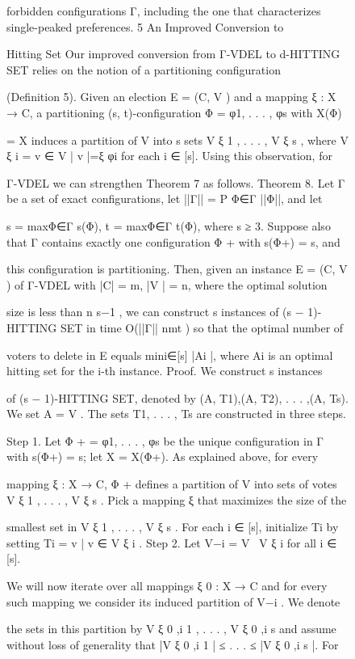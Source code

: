 \documentclass[12pt, a4paper]{report}
\begin{document}
\begin{figure}[ht!]
forbidden configurations Γ, including the one that characterizes single-peaked preferences. 5 An Improved Conversion to 

Hitting Set Our improved conversion from Γ-VDEL to d-HITTING SET relies on the notion of a partitioning configuration 

(Definition 5). Given an election E = (C, V ) and a mapping ξ : X → C, a partitioning (s, t)-configuration Φ = {φ1, . . . , φs} with X(Φ) 

= X induces a partition of V into s sets V ξ 1 , . . . , V ξ s , where V ξ i = {v ∈ V | v |=ξ φi} for each i ∈ [s]. Using this observation, for 

Γ-VDEL we can strengthen Theorem 7 as follows. Theorem 8. Let Γ be a set of exact configurations, let ||Γ|| = P Φ∈Γ ||Φ||, and let 

s = maxΦ∈Γ s(Φ), t = maxΦ∈Γ t(Φ), where s ≥ 3. Suppose also that Γ contains exactly one configuration Φ + with s(Φ+) = s, and 

this configuration is partitioning. Then, given an instance E = (C, V ) of Γ-VDEL with |C| = m, |V | = n, where the optimal solution 

size is less than n s−1 , we can construct s instances of (s − 1)-HITTING SET in time O(||Γ|| nmt ) so that the optimal number of 

voters to delete in E equals mini∈[s] |Ai |, where Ai is an optimal hitting set for the i-th instance. Proof. We construct s instances 

of (s − 1)-HITTING SET, denoted by (A, T1),(A, T2), . . . ,(A, Ts). We set A = V . The sets T1, . . . , Ts are constructed in three steps. 

Step 1. Let Φ + = {φ1, . . . , φs} be the unique configuration in Γ with s(Φ+) = s; let X = X(Φ+). As explained above, for every 

mapping ξ : X → C, Φ + defines a partition of V into sets of votes V ξ 1 , . . . , V ξ s . Pick a mapping ξ that maximizes the size of the 

smallest set in {V ξ 1 , . . . , V ξ s }. For each i ∈ [s], initialize Ti by setting Ti = {{v} | v ∈ V ξ i }. Step 2. Let V−i = V \ V ξ i for all i ∈ [s]. 

We will now iterate over all mappings ξ 0 : X → C and for every such mapping we consider its induced partition of V−i . We denote 

the sets in this partition by V ξ 0 ,i 1 , . . . , V ξ 0 ,i s and assume without loss of generality that |V ξ 0 ,i 1 | ≤ . . . ≤ |V ξ 0 ,i s |. For 


\end{figure}
\end{document}
